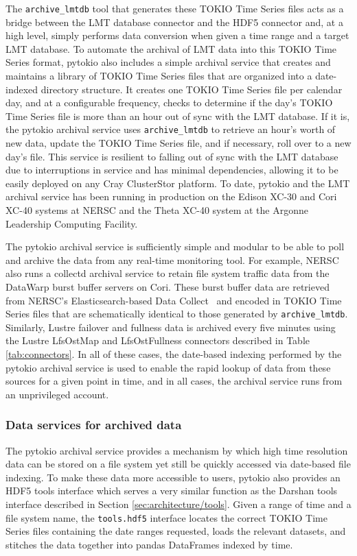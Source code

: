 The \texttt{archive\_lmtdb} tool that generates these TOKIO Time Series files acts as a bridge between the LMT database connector and the HDF5 connector and, at a high level, simply performs data conversion when given a time range and a target LMT database.
To automate the archival of LMT data into this TOKIO Time Series format, pytokio also includes a simple archival service that creates and maintains a library of TOKIO Time Series files that are organized into a date-indexed directory structure.
It creates one TOKIO Time Series file per calendar day, and at a configurable frequency, checks to determine if the day's TOKIO Time Series file is more than an hour out of sync with the LMT database.
If it is, the pytokio archival service uses \texttt{archive\_lmtdb} to retrieve an hour's worth of new data, update the TOKIO Time Series file, and if necessary, roll over to a new day's file.
This service is resilient to falling out of sync with the LMT database due to interruptions in service and has minimal dependencies, allowing it to be easily deployed on any Cray ClusterStor platform.
To date, pytokio and the LMT archival service has been running in production on the Edison XC-30 and Cori XC-40 systems at NERSC and the Theta XC-40 system at the Argonne Leadership Computing Facility.

The pytokio archival service is sufficiently simple and modular to be able to poll and archive the data from any real-time monitoring tool.
For example, NERSC also runs a collectd archival service to retain file system traffic data from the DataWarp burst buffer servers on Cori. 
These burst buffer data are retrieved from NERSC's Elasticsearch-based Data Collect~\cite{Whitney2016} and encoded in TOKIO Time Series files that are schematically identical to those generated by \texttt{archive\_lmtdb}.
Similarly, Lustre failover and fullness data is archived every five minutes using the Lustre LfsOstMap and LfsOstFullness connectors described in Table \ref{tab:connectors}.
In all of these cases, the date-based indexing performed by the pytokio archival service is used to enable the rapid lookup of data from these sources for a given point in time, and in all cases, the archival service runs from an unprivileged account.

\subsubsection{Data services for archived data}

The pytokio archival service provides a mechanism by which high time resolution data can be stored on a file system yet still be quickly accessed via date-based file indexing.
To make these data more accessible to users, pytokio also provides an HDF5 tools interface which serves a very similar function as the Darshan tools interface described in Section \ref{sec:architecture/tools}.
Given a range of time and a file system name, the \texttt{tools.hdf5} interface locates the correct TOKIO Time Series files containing the date ranges requested, loads the relevant datasets, and stitches the data together into pandas DataFrames indexed by time.

